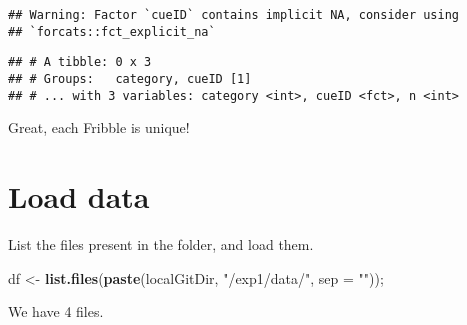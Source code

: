 \documentclass[
]{article}
\newenvironment{Shaded}{\begin{snugshade}}{\end{snugshade}}
\newcommand{\ControlFlowTok}[1]{\textcolor[rgb]{0.13,0.29,0.53}{\textbf{#1}}}
\newcommand{\DataTypeTok}[1]{\textcolor[rgb]{0.13,0.29,0.53}{#1}}
\newcommand{\DecValTok}[1]{\textcolor[rgb]{0.00,0.00,0.81}{#1}}
\newcommand{\KeywordTok}[1]{\textcolor[rgb]{0.13,0.29,0.53}{\textbf{#1}}}
\newcommand{\NormalTok}[1]{#1}
\newcommand{\OperatorTok}[1]{\textcolor[rgb]{0.81,0.36,0.00}{\textbf{#1}}}
\newcommand{\StringTok}[1]{\textcolor[rgb]{0.31,0.60,0.02}{#1}}
\begin{document}
\begin{verbatim}
## Warning: Factor `cueID` contains implicit NA, consider using
## `forcats::fct_explicit_na`
\end{verbatim}

\begin{verbatim}
## # A tibble: 0 x 3
## # Groups:   category, cueID [1]
## # ... with 3 variables: category <int>, cueID <fct>, n <int>
\end{verbatim}

Great, each Fribble is unique!

\hypertarget{load-data}{%
\section{Load data}\label{load-data}}

List the files present in the folder, and load them.

\begin{Shaded}
\begin{Highlighting}[]
\NormalTok{df <-}\StringTok{ }\KeywordTok{list.files}\NormalTok{(}\KeywordTok{paste}\NormalTok{(localGitDir, }\StringTok{"/exp1/data/"}\NormalTok{, }\DataTypeTok{sep =} \StringTok{""}\NormalTok{)); }
\end{Highlighting}
\end{Shaded}

We have 4 files.

\begin{Shaded}
\end{Shaded}
\end{document}
